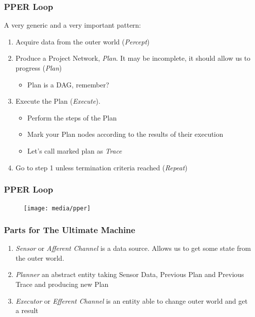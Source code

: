 \documentclass{beamer}
\begin{document}
\begin{frame}
    \frametitle{PPER Loop}  
    
    A very generic and a very important pattern:
\begin{enumerate}
    \item Acquire data from the outer world (\textit{Percept})
    \item Produce a Project Network, \textit{Plan}. 
          It may be incomplete, it should allow us to progress (\textit{Plan})
          \begin{itemize}
            \item Plan is a DAG, remember?       
          \end{itemize} 
    \item Execute the Plan (\textit{Execute}). 
    \begin{itemize}
        \item Perform the steps of the Plan
        \item Mark your Plan nodes according to the results of their execution    
        \item Let's call marked plan as \textit{Trace}
      \end{itemize} 
    \item Go to step 1 unless termination criteria reached (\textit{Repeat})
\end{enumerate}
\end{frame}

\begin{frame}
    \frametitle{PPER Loop}
    
    \begin{figure}
        \texttt{[image: media/pper]}
    \end{figure}
\end{frame}

\begin{frame}
    \frametitle{Parts for The Ultimate Machine}  
\begin{enumerate}
    \item \textit{Sensor} or \textit{Afferent Channel} is a data source. Allows us to get some state from the outer world.
    \item \textit{Planner} an abstract entity taking Sensor Data, Previous Plan and Previous Trace and producing new Plan
    \item \textit{Executor} or \textit{Efferent Channel} is an entity able to change outer world and get a result
\end{enumerate}
\end{frame}
\end{document}
